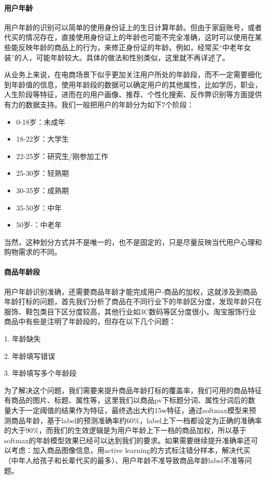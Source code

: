 	\paragraph{用户年龄}
	
	用户年龄的识别可以简单的使用身份证上的生日计算年龄。但由于家庭账号，或者代买的情况存在，直接使用身份证上的年龄也可能不完全准确，这时可以使用在某些能反映年龄的商品上的行为，来修正身份证的年龄。例如，经常买“中老年女装”的人，可能年龄较大。具体的做法和性别类似，这里就不再详述了。
	
	从业务上来说，在电商场景下似乎更加关注用户所处的年龄段，而不一定需要细化到年龄值的信息，使用年龄段的数据可以确定用户的其他属性，比如学历，职业，人生阶段等特征，进而在的用户画像、推荐、个性化搜索、反作弊识别等方面提供有力的数据支持。我们一般把用户的年龄分为如下7个阶段：
	
	\begin{itemize}
		\item{0-18岁：未成年}
		\item{18-22岁：大学生}
		\item{22-25岁：研究生/刚参加工作}
		\item{25-30岁：轻熟期}
		\item{30-35岁：成熟期}
		\item{35-50岁：中年}
		\item{50岁-：中老年}
	\end{itemize}

	当然，这种划分方式并不是唯一的，也不是固定的，只是尽量反映当代用户心理和购物需求的不同。
	
	\paragraph{商品年龄段}	
	
	用户年龄识别准确，还需要商品年龄才能完成用户-商品的加权，这就涉及到商品年龄打标的问题，首先我们分析了商品在不同行业下的年龄区分度，发现年龄只在服饰、鞋包类目下区分度较高，其他行业如3C数码等区分度很小。淘宝服饰行业商品中有些是注明了年龄段的，但存在以下几个问题：
	
	1. 年龄缺失
	
	2. 年龄填写错误
	
	3. 年龄填写多个年龄段
	
	为了解决这个问题，我们需要来提升商品年龄打标的覆盖率，我们可用的商品特征有商品的图片、标题、属性等，这里我们以商品pv下标题分词、属性分词后的数量大于一定阈值的结果作为特征，最终选出大约15w特征，通过softmax模型来预测商品年龄，基于label的预测准确率约60\%，label上下一档都设定为正确的准确率的大于90\%，而我们的生效逻辑是为用户年龄上下一档的商品加权，所以基于softmax的年龄模型效果已经可以达到我们的要求。如果需要继续提升准确率还可以考虑：加入商品图像信息，用active learning的方式标注错分样本，解决代买（中年人给孩子和长辈代买的最多）、用户年龄不准导致商品年龄label不准等问题。 
	
